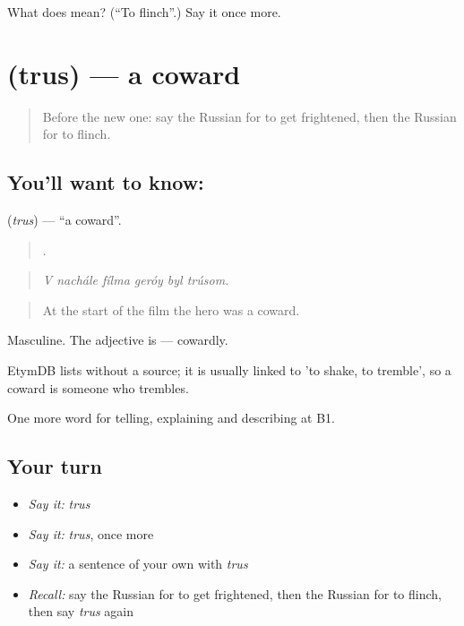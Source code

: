 \begin{tcolorbox}[breakable,colback=teal!4,colframe=teal!35!black,title={Before you move on}]
What does  mean? (\textquotedblleft{}To flinch\textquotedblright{}.) Say it once more.
\end{tcolorbox}
\section[\texorpdfstring{\ru{трус} (trus)}{трус (trus)}]{ (trus) — a coward}

\label{lesson:RU-C476-trus}



\begin{quote}
Before the new one: say the Russian for to get frightened, then the Russian for to flinch.
\end{quote}

\subsection*{You'll want to know: }
\textbf{} (\emph{trus}) — \textquotedblleft{}a coward\textquotedblright{}.

\begin{quote}
     .
\end{quote}

\begin{quote}
\emph{V nachále fílma geróy byl trúsom.}
\end{quote}

\begin{quote}
At the start of the film the hero was a coward.
\end{quote}

Masculine. The adjective is \emph{} — cowardly.

\begin{cousinweb}
EtymDB lists \emph{} without a source; it is usually linked to \emph{} 'to shake, to tremble', so a coward is someone who trembles.
\end{cousinweb}

\begin{grammarlens}[title={What you've built}]
One more word for telling, explaining and describing at B1.
\end{grammarlens}

\subsection*{Your turn}
\begin{itemize}
\raggedright
  \item \emph{Say it:} \emph{trus}
  \item \emph{Say it:} \emph{trus}, once more
  \item \emph{Say it:} a sentence of your own with \emph{trus}
  \item \emph{Recall:} say the Russian for to get frightened, then the Russian for to flinch, then say \emph{trus} again
\end{itemize}


